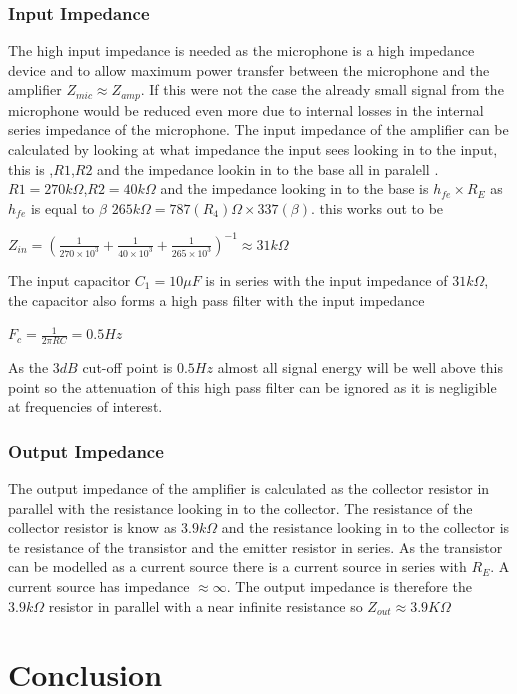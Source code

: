 \documentclass[10pt,a4paper]{article}
\begin{document}
\subsubsection{Input Impedance}
The high input impedance is needed as the microphone is a high impedance device and to allow maximum power transfer between the microphone and the amplifier $Z_{mic} \approx Z_{amp}$. If this were not the case the already small signal from the microphone would be reduced even more due to internal losses in the internal series impedance of the microphone. The input impedance of the amplifier can be calculated by looking at what impedance the input sees looking in to the input, this is ,$R1$,$R2$ and the impedance lookin in to the base all in paralell \cite{ArtElectronics}. $R1 = 270k\Omega$,$R2 = 40k\Omega$ and the impedance looking in to the base is $h_{fe} \times R_E$ as $h_{fe}$ is equal to $\beta$ \cite{ArtElectronics} $265k\Omega= 787(R_4)\Omega \times 337(\beta)$.
this works out to be  

\begin{center}
\Huge

$Z_{in}= (\frac{1}{270\times 10^{3}} +\frac{1}{40\times 10^{3}} + \frac{1}{265 \times 10^{3}} )^{-1} \approx 31k\Omega$



\end{center}
The input capacitor $C_1 = 10\mu F$ is in series with the input impedance of $31k\Omega$, the capacitor also forms a high pass filter with the input impedance 
\begin{center}
\Huge

$F_c = \frac{1}{2\pi RC} = 0.5Hz$



\end{center}
\cite{ArtElectronics}
As the $3dB$ cut-off point is $0.5Hz$ almost all signal energy will be well above this point so the attenuation of this high pass filter can be ignored as it is negligible at frequencies of interest.
\subsubsection{Output Impedance}
The output impedance of the amplifier is calculated as the collector resistor in parallel with the resistance looking in to the collector. The resistance of the collector resistor is know as $3.9k\Omega$ and the resistance looking in to the collector is te resistance of the transistor and the emitter resistor in series. As the transistor can be modelled as a current source there is a current source in series with $R_E$. A current source has impedance $\approx \infty$. The output impedance is therefore the $3.9k\Omega$ resistor in parallel with a near infinite resistance so $Z_{out} \approx 3.9K\Omega$  

\section{Conclusion}

\printbibliography
\end{document}
